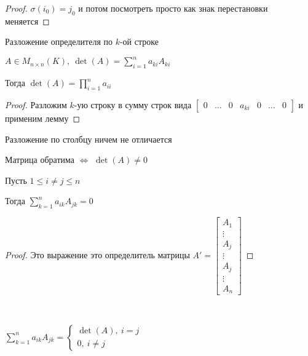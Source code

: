 \begin{proof}
    $\sigma(i_0) = j_0$ и потом посмотреть просто как знак перестановки меняется
\end{proof}

\begin{theorem}
    Разложение определителя по $k$-ой строке

    $A \in M_{n \times n}(K),~ \det(A) = \sum_{i = 1}^n a_{ki}A_{ki}$

    Тогда $\det(A) = \prod\limits_{i = 1}^n a_{ii}$
\end{theorem}

\begin{proof}
    Разложим $k$-ую строку в сумму строк вида $\begin{bmatrix}
        0 & \ldots & 0 & a_{ki} & 0 & \ldots & 0
    \end{bmatrix}$ и применим лемму
\end{proof}

\begin{follow}
    Разложение по столбцу ничем не отличается
\end{follow}

\begin{follow}
    Матрица обратима $\iff$ $\det(A) \neq 0$
\end{follow}

\begin{lemma}
    Пусть $1 \le i \neq j \le n$

    Тогда $\sum\limits_{k = 1}^n a_{ik}A_{jk} = 0$
\end{lemma}

\begin{proof}
    Это выражение это определитель матрицы $A' = \begin{bmatrix}
        A_1 \\
        \vdots \\
        A_j \\
        \vdots \\
        A_j \\
        \vdots \\
        A_n
    \end{bmatrix}$
\end{proof}

\begin{follow}~
    
    $\sum\limits_{k = 1}^n a_{ik}A_{jk} = \begin{cases}
        \det(A), ~ i = j \\
        0, ~ i \neq j
    \end{cases}$
    
\end{follow}

